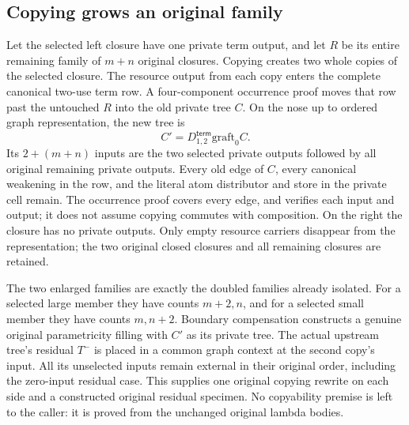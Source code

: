 \par{}
\par{}


\subsection{Copying grows an original family}
Let the selected left closure have one private term output, and let $R$
be its entire remaining family of $m+n$ original closures. Copying creates
two whole copies of the selected closure. The resource output from each
copy enters the complete canonical two-use term row. A four-component
occurrence proof moves that row past the untouched $R$ into the old private
tree $C$. On the nose up to ordered graph representation, the new tree is
\[
 C' = D^{\mathsf{term}}_{1,2}\mathbin{\mathrm{graft}_0} C.
\]
Its $2+(m+n)$ inputs are the two selected private outputs followed by all
original remaining private outputs. Every old edge of $C$, every canonical
weakening in the row, and the literal atom distributor and store in the
private cell remain. The occurrence proof covers every edge, and verifies
each input and output; it does not assume copying commutes with composition.
On the right the closure has no private outputs. Only empty resource
carriers disappear from the representation; the two original closed
closures and all remaining closures are retained.

The two enlarged families are exactly the doubled families already isolated.
For a selected large member they have counts $m+2,n$, and for a selected
small member they have counts $m,n+2$. Boundary compensation constructs a
genuine original parametricity filling with $C'$ as its private tree.
The actual upstream tree's residual $T^{-}$ is placed in a common graph
context at the second copy's input. All its unselected inputs remain
external in their original order, including the zero-input residual case.
This supplies one original copying rewrite on each side and a constructed
original residual specimen. No copyability premise is left to the caller:
it is proved from the unchanged original lambda bodies.

\par{}
\par{}
\par{}
\par{}
\par{}
\par{}


